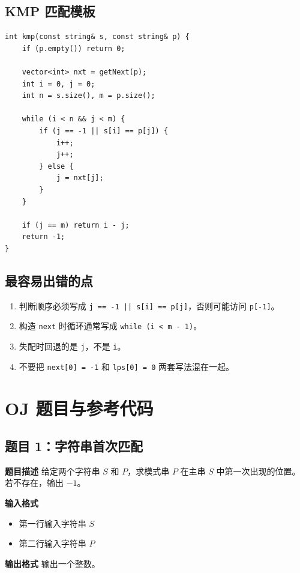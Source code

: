 \documentclass[12pt,a4paper]{article}
\begin{document}
\subsection{KMP 匹配模板}
\begin{lstlisting}
int kmp(const string& s, const string& p) {
    if (p.empty()) return 0;

    vector<int> nxt = getNext(p);
    int i = 0, j = 0;
    int n = s.size(), m = p.size();

    while (i < n && j < m) {
        if (j == -1 || s[i] == p[j]) {
            i++;
            j++;
        } else {
            j = nxt[j];
        }
    }

    if (j == m) return i - j;
    return -1;
}
\end{lstlisting}

\subsection{最容易出错的点}
\begin{enumerate}
    \item 判断顺序必须写成 \texttt{j == -1 || s[i] == p[j]}，否则可能访问 \texttt{p[-1]}。
    \item 构造 \texttt{next} 时循环通常写成 \texttt{while (i < m - 1)}。
    \item 失配时回退的是 \texttt{j}，不是 \texttt{i}。
    \item 不要把 \texttt{next[0] = -1} 和 \texttt{lps[0] = 0} 两套写法混在一起。
\end{enumerate}

\section{OJ 题目与参考代码}

\subsection*{题目 1：字符串首次匹配}

\textbf{题目描述}  
给定两个字符串 $S$ 和 $P$，求模式串 $P$ 在主串 $S$ 中第一次出现的位置。若不存在，输出 $-1$。

\textbf{输入格式}
\begin{itemize}
    \item 第一行输入字符串 $S$
    \item 第二行输入字符串 $P$
\end{itemize}

\textbf{输出格式}  
输出一个整数。
\end{document}
